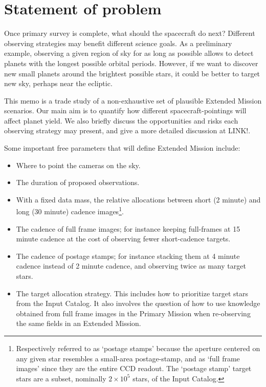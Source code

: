 \section{Statement of problem}

Once \tesss primary survey is complete, what should the spacecraft do next? 
Different observing strategies may benefit different science goals. 
As a preliminary example, observing a given region of sky for as long as possible allows \tess to detect planets with the longest possible orbital periods.
However, if we want to discover new small planets around the brightest possible stars, it could be better to target new sky, perhaps near the ecliptic.


This memo is a trade study of a non-exhaustive set of plausible Extended Mission scenarios. 
Our main aim is to quantify how different spacecraft-pointings will affect \tesss planet yield.
We also briefly discuss the opportunities and risks each observing strategy may present, and give a more detailed discussion at LINK!.

Some important free parameters that will define \tesss Extended Mission include:
\begin{itemize}
	\item Where to point the cameras on the sky.
	\item The duration of proposed observations.
	\item With a fixed data mass, the relative allocations between short (2 minute) and long (30 minute) cadence images\footnote{Respectively referred to as `postage stamps' because the aperture centered on any given star resembles a small-area postage-stamp, and as `full frame images' since they are the entire CCD readout. The `postage stamp' target stars are a subset, nominally $2\times 10^5$ stars, of the \tess Input Catalog.}. 
	\item The cadence of full frame images; for instance keeping full-frames at 15 minute cadence at the cost of observing fewer short-cadence targets.
	\item The cadence of postage stamps; for instance stacking them at 4 minute cadence instead of 2 minute cadence, and observing twice as many target stars.
	\item The target allocation strategy. This includes how to prioritize target stars from the \tess Input Catalog. It also involves the question of how to use knowledge obtained from full frame images in the Primary Mission when re-observing the same fields in an Extended Mission.
\end{itemize}

